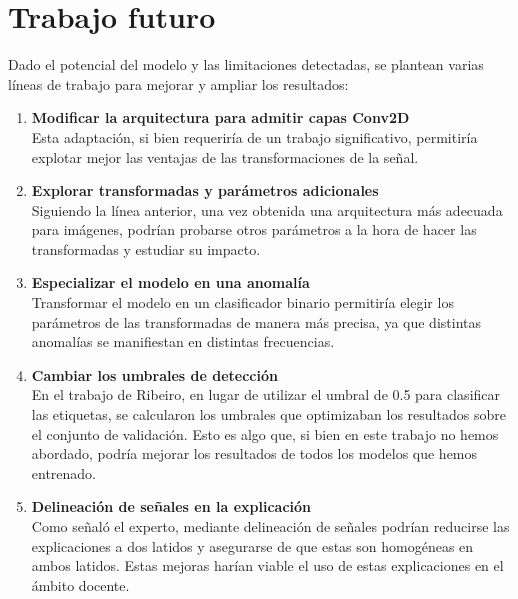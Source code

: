 \section{Trabajo futuro}
Dado el potencial del modelo y las limitaciones detectadas, se plantean varias líneas de trabajo para mejorar y ampliar los resultados:
\begin{enumerate}
	\item \textbf{Modificar la arquitectura para admitir capas Conv2D} \\
	Esta adaptación, si bien requeriría de un trabajo significativo, permitiría explotar mejor las ventajas de las transformaciones de la señal.
	\item \textbf{Explorar transformadas y parámetros adicionales} \\
	Siguiendo la línea anterior, una vez obtenida una arquitectura más adecuada para imágenes, podrían probarse otros parámetros a la hora de hacer las transformadas y estudiar su impacto.
	\item \textbf{Especializar el modelo en una anomalía} \\
	Transformar el modelo en un clasificador binario permitiría elegir los parámetros de las transformadas de manera más precisa, ya que distintas anomalías se manifiestan en distintas frecuencias.
	\item \textbf{Cambiar los umbrales de detección} \\
	En el trabajo de Ribeiro, en lugar de utilizar el umbral de 0.5 para clasificar las etiquetas, se calcularon los umbrales que optimizaban los resultados sobre el conjunto de validación. Esto es algo que, si bien en este trabajo no hemos abordado, podría mejorar los resultados de todos los modelos que hemos entrenado.
	\item \textbf{Delineación de señales en la explicación} \\
	Como señaló el experto, mediante delineación de señales podrían reducirse las explicaciones a dos latidos y asegurarse de que estas son homogéneas en ambos latidos. Estas mejoras harían viable el uso de estas explicaciones en el ámbito docente.
\end{enumerate}

